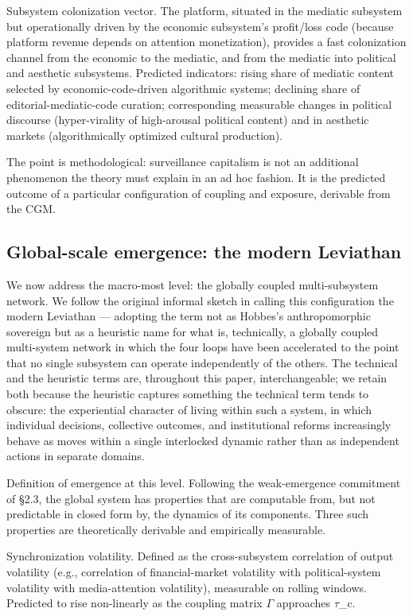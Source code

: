 \documentclass[12pt,a4paper]{article}
\begin{document}
Subsystem colonization vector. The platform, situated in the mediatic subsystem but operationally driven by the economic subsystem's profit/loss code (because platform revenue depends on attention monetization), provides a fast colonization channel from the economic to the mediatic, and from the mediatic into political and aesthetic subsystems. Predicted indicators: rising share of mediatic content selected by economic-code-driven algorithmic systems; declining share of editorial-mediatic-code curation; corresponding measurable changes in political discourse (hyper-virality of high-arousal political content) and in aesthetic markets (algorithmically optimized cultural production).


The point is methodological: surveillance capitalism is not an additional phenomenon the theory must explain in an ad hoc fashion. It is the predicted outcome of a particular configuration of coupling and exposure, derivable from the CGM.

\subsection{Global-scale emergence: the modern Leviathan}

We now address the macro-most level: the globally coupled multi-subsystem network. We follow the original informal sketch in calling this configuration the modern Leviathan --- adopting the term not as Hobbes's anthropomorphic sovereign but as a heuristic name for what is, technically, a globally coupled multi-system network in which the four loops have been accelerated to the point that no single subsystem can operate independently of the others. The technical and the heuristic terms are, throughout this paper, interchangeable; we retain both because the heuristic captures something the technical term tends to obscure: the experiential character of living within such a system, in which individual decisions, collective outcomes, and institutional reforms increasingly behave as moves within a single interlocked dynamic rather than as independent actions in separate domains.


Definition of emergence at this level. Following the weak-emergence commitment of §2.3, the global system has properties that are computable from, but not predictable in closed form by, the dynamics of its components. Three such properties are theoretically derivable and empirically measurable.


Synchronization volatility. Defined as the cross-subsystem correlation of output volatility (e.g., correlation of financial-market volatility with political-system volatility with media-attention volatility), measurable on rolling windows. Predicted to rise non-linearly as the coupling matrix $\Gamma$ approaches $\tau$_c.
\end{document}
